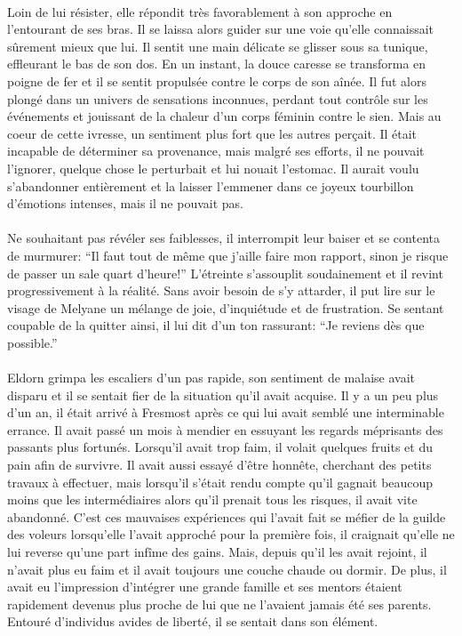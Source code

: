 \paragraph{}
Loin de lui résister, elle répondit très favorablement à son approche en
l'entourant de ses bras. Il se laissa alors guider sur une voie qu'elle
connaissait sûrement mieux que lui. Il sentit une main délicate
se glisser sous sa tunique, effleurant le bas de son dos. En un instant, la
douce caresse se transforma en poigne de fer et il se sentit propulsée contre
le corps de son aînée. Il fut alors plongé dans un univers de sensations
inconnues, perdant tout contrôle sur les événements et jouissant de
la chaleur d'un corps féminin contre le sien. Mais au coeur de cette ivresse,
un sentiment plus fort que les autres perçait. Il était incapable de
déterminer sa provenance, mais malgré ses efforts, il ne pouvait l'ignorer,
quelque chose le perturbait et lui nouait l'estomac. Il aurait voulu
s'abandonner entièrement et la laisser l'emmener dans ce joyeux tourbillon
d'émotions intenses, mais il ne pouvait pas.

\paragraph{}
Ne souhaitant pas révéler ses faiblesses, il interrompit leur baiser et se
contenta de murmurer: ``Il faut tout de même que j'aille faire mon rapport,
sinon je risque de passer un sale quart d'heure!'' L'étreinte s'assouplit
soudainement et il revint progressivement à la réalité. Sans avoir besoin de
s'y attarder, il put lire sur le visage de Melyane un mélange de joie,
d'inquiétude et de frustration. Se sentant coupable de la quitter ainsi, il
lui dit d'un ton rassurant: ``Je reviens dès que possible.''

\paragraph{}
Eldorn grimpa les escaliers d'un pas rapide, son sentiment de malaise avait
disparu et il se sentait fier de la situation qu'il avait acquise. Il y a un
peu plus d'un an, il était arrivé à Fresmost après ce qui lui avait semblé une
interminable errance. Il avait passé un mois à mendier en essuyant les regards
méprisants des passants plus fortunés. Lorsqu'il avait trop faim, il volait
quelques fruits et du pain afin de survivre. Il avait aussi essayé d'être
honnête, cherchant des petits travaux à effectuer, mais lorsqu'il s'était
rendu compte qu'il gagnait beaucoup moins que les intermédiaires alors qu'il
prenait tous les risques, il avait vite abandonné. C'est ces mauvaises
expériences qui l'avait fait se méfier de la guilde des voleurs lorsqu'elle
l'avait approché pour la première fois, il craignait qu'elle ne lui reverse
qu'une part infîme des gains. Mais, depuis qu'il les avait rejoint, il n'avait
plus eu faim et il avait toujours une couche chaude ou dormir. De plus, il
avait eu l'impression d'intégrer une grande famille et ses mentors étaient
rapidement devenus plus proche de lui que ne l'avaient jamais été ses parents.
Entouré d'individus avides de liberté, il se sentait dans son élément.

